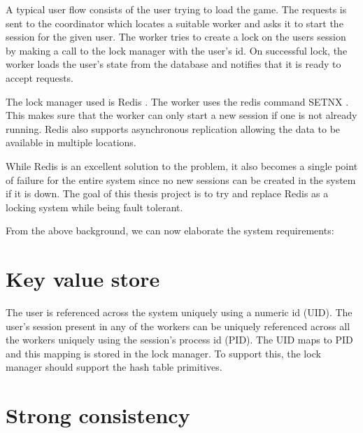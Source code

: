 A typical user flow consists of the user trying to load the game. The requests
is sent to the coordinator which locates a suitable worker and asks it to
start the session for the given user. The worker tries to create a lock on
the users session by making a call to the lock manager with the user's id.
On successful lock, the worker loads the user's state from the database and
notifies that it is ready to accept requests.

The lock manager used is Redis \citep{redis}%
. The worker uses the redis command SETNX%
. This makes sure that the worker can only start a new session if one is
not already running. Redis also supports asynchronous replication allowing the
data to be available in multiple locations.

While Redis is an excellent solution to the problem, it also becomes a single
point of failure for the entire system since no new sessions can be created in
the system if it is down. The goal of this thesis project is to try and replace
Redis as a locking system while being fault tolerant.

From the above background, we can now elaborate the system requirements:

\section{Key value store}
\label{section:ml.kv.store}


The user is referenced across the system uniquely using a numeric id (UID). The
user's session present in any of the workers can be uniquely referenced across
all the workers uniquely using the session's process id (PID). The UID maps to
PID and this mapping is stored in the lock manager. To support this, the lock
manager should support the hash table primitives.

\section{Strong consistency}


